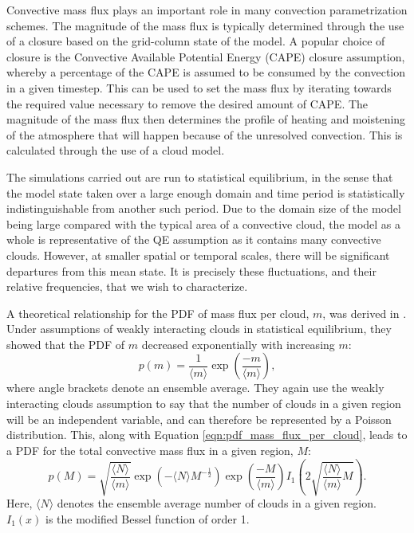 \documentclass[11pt,a4paper]{article}
\begin{document}
Convective mass flux plays an important role in many convection parametrization schemes. The magnitude of the mass flux is typically determined through the use of a closure based on the grid-column state of the model. A popular choice of closure is the Convective Available Potential Energy (CAPE) closure assumption, whereby a percentage of the CAPE is assumed to be consumed by the convection in a given timestep. This can be used to set the mass flux by iterating towards the required value necessary to remove the desired amount of CAPE. The magnitude of the mass flux then determines the profile of heating and moistening of the atmosphere that will happen because of the unresolved convection. This is calculated through the use of a cloud model.

The simulations carried out are run to statistical equilibrium, in the sense that the model state taken over a large enough domain and time period is statistically indistinguishable from another such period. Due to the domain size of the model being large compared with the typical area of a convective cloud, the model as a whole is representative of the QE assumption as it contains many convective clouds. However, at smaller spatial or temporal scales, there will be significant departures from this mean state. It is precisely these fluctuations, and their relative frequencies, that we wish to characterize.

A theoretical relationship for the PDF of mass flux per cloud, $m$, was derived in \cite{CC2006I}. Under assumptions of weakly interacting clouds in statistical equilibrium, they showed that the PDF of $m$ decreased exponentially with increasing $m$:
\begin{equation}
    p(m) = \frac{1}{\langle m \rangle} \exp \left(\frac{-m}{\langle m \rangle} \right),
    \label{eqn:pdf_mass_flux_per_cloud}
\end{equation}
where angle brackets denote an ensemble average. They again use the weakly interacting clouds assumption to say that the number of clouds in a given region will be an independent variable, and can therefore be represented by a Poisson distribution. This, along with Equation \ref{eqn:pdf_mass_flux_per_cloud}, leads to a PDF for the total convective mass flux in a given region, $M$:
\begin{equation}
    p(M) = \sqrt{\frac{\langle N \rangle}{\langle m \rangle}} \exp \left( -\langle N \rangle M^{-\frac{1}{2}} \right) \exp \left( \frac{-M}{\langle m \rangle} \right)  I_1\left(2 \sqrt{\frac{\langle N \rangle}{\langle m \rangle} M}\right).
    \label{eqn:pdf_mass_flux}
\end{equation}
Here, $\langle N \rangle$ denotes the ensemble average number of clouds in a given region. $I_1(x)$ is the modified Bessel function of order 1.
\end{document}
